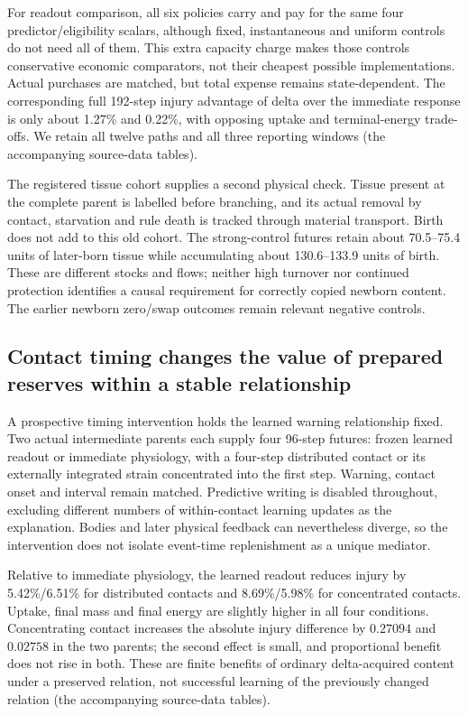 For readout comparison, all six policies carry and pay for the same four predictor/eligibility scalars, although fixed, instantaneous and uniform controls do not need all of them. This extra capacity charge makes those controls conservative economic comparators, not their cheapest possible implementations. Actual purchases are matched, but total expense remains state-dependent. The corresponding full 192-step injury advantage of delta over the immediate response is only about 1.27\% and 0.22\%, with opposing uptake and terminal-energy trade-offs. We retain all twelve paths and all three reporting windows (the accompanying source-data tables).

The registered tissue cohort supplies a second physical check. Tissue present at the complete parent is labelled before branching, and its actual removal by contact, starvation and rule death is tracked through material transport. Birth does not add to this old cohort. The strong-control futures retain about 70.5--75.4 units of later-born tissue while accumulating about 130.6--133.9 units of birth. These are different stocks and flows; neither high turnover nor continued protection identifies a causal requirement for correctly copied newborn content. The earlier newborn zero/swap outcomes remain relevant negative controls.

\subsection*{Contact timing changes the value of prepared reserves within a stable relationship}

A prospective timing intervention holds the learned warning relationship fixed. Two actual intermediate parents each supply four 96-step futures: frozen learned readout or immediate physiology, with a four-step distributed contact or its externally integrated strain concentrated into the first step. Warning, contact onset and interval remain matched. Predictive writing is disabled throughout, excluding different numbers of within-contact learning updates as the explanation. Bodies and later physical feedback can nevertheless diverge, so the intervention does not isolate event-time replenishment as a unique mediator.

Relative to immediate physiology, the learned readout reduces injury by 5.42\%/6.51\% for distributed contacts and 8.69\%/5.98\% for concentrated contacts. Uptake, final mass and final energy are slightly higher in all four conditions. Concentrating contact increases the absolute injury difference by $0.27094$ and $0.02758$ in the two parents; the second effect is small, and proportional benefit does not rise in both. These are finite benefits of ordinary delta-acquired content under a preserved relation, not successful learning of the previously changed relation (the accompanying source-data tables).

